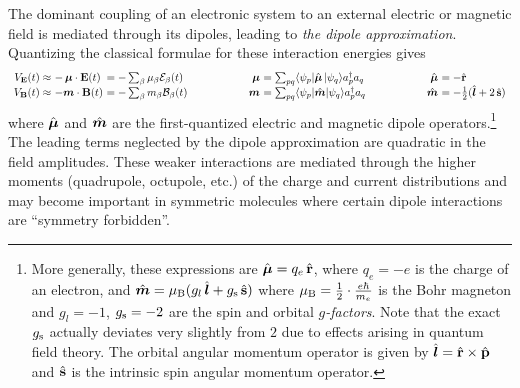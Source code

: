 \documentclass[11pt]{article}
\numberwithin{equation}{section}
\begin{document}
\begin{ex}
\label{ex:dipole-approximation}
The dominant coupling of an electronic system to an external electric or magnetic field is mediated through its dipoles, leading to \textit{the dipole approximation}.
Quantizing the classical formulae for these interaction energies gives
\begin{align}
\begin{array}{r@{\ }l@{\ }l@{\hspace{2cm}}r@{\ }l@{\hspace{2cm}}r@{\ }l}
  V_{\bo{E}}(t)
\approx&
-\,
  \bm{\mu}\cdot\bo{E}(t)
&=
-
  \sum_\b
  \mu_\b
  \mc{E}_\b(t)
&
  \bm{\mu}
&=
  \sum_{pq}
  \ip{\y_p|\op{\bm{\mu}}\,|\y_q}
  a_p\dg a_q
&
  \op{\bm{\mu}}
&=
-
  \op{\bo{r}}
\\
  V_{\bo{B}}(t)
\approx&
-
  \bm{m}\cdot\bo{B}(t)
&=
-
  \sum_\b
  m_\b
  \mc{B}_\b(t)
&
  \bm{m}
&=
  \sum_{pq}
  \ip{\y_p|\op{\bm{m}}|\y_q}
  a_p\dg a_q
&
  \op{\bm{m}}
&=
-
  \tfr{1}{2}
  (
    \op{\bm{l}}
  +
    2\,
    \op{\bo{s}}
  )
\end{array}
\end{align}
where $\op{\bm{\mu}}$ and $\op{\bm{m}}$ are the first-quantized electric and magnetic dipole operators.\footnote{
More generally, these expressions are
$
  \op{\bm{\mu}}
=
  q_e\,\op{\bo{r}}
$,
where $q_e=-e$ is the charge of an electron,
and
$
  \op{\bm{m}}
=
  \mu_\mr{B}
  (
    g_l\,
    \op{\bm{l}}
  +
    g_{\mr{s}}\,
    \op{\bo{s}}
  )
$
where $\mu_{\mr{B}}=\tfr{1}{2}\cdot\tfr{e\hbar}{m_e}$ is the Bohr magneton and $g_l=-1$, $g_{\mathrm{s}}=-2$ are the spin and orbital \textit{$g$-factors}.
Note that the exact $g_{\mathrm{s}}$ actually deviates very slightly from $2$ due to effects arising in quantum field theory.
The orbital angular momentum operator is given by $\op{\bm{l}}=\op{\bo{r}}\times\op{\bo{p}}$ and $\hat{\mathbf{s}}$ is the intrinsic spin angular momentum operator.
}
The leading terms neglected by the dipole approximation are quadratic in the field amplitudes.
These weaker interactions are mediated through the higher moments (quadrupole, octupole, etc.) of the charge and current distributions and may become important in symmetric molecules where certain dipole interactions are ``symmetry forbidden''.
\end{ex}
\end{document}
